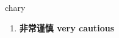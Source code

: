 
\begin{frame}
{\huge chary}
\begin{center}
\begin{enumerate}\Large
  \item \textbf{非常谨慎 very cautious}
\end{enumerate}
\end{center}
\end{frame}
